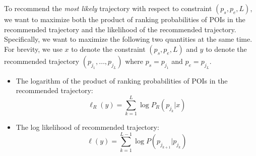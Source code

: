 To recommend the \textit{most likely} trajectory with respect to constraint $(p_s, p_e, L)$,
we want to maximize both the product of ranking probabilities of POIs in the recommended trajectory and
the likelihood of the recommended trajectory.
Specifically, we want to maximize the following two quantities at the same time.
For brevity, we use $x$ to denote the constraint $(p_s, p_e, L)$ and $y$ to denote the
recommended trajectory $(p_{j_1}, \dots, p_{j_L})$ where $p_s = p_{j_1}$ and $p_e = p_{j_L}$.

\begin{itemize}
\item The logarithm of the product of ranking probabilities of POIs in the recommended trajectory:
      \begin{displaymath}
          \ell_R(y) = \sum_{k=1}^L \log P_R(p_{j_k} | x)
      \end{displaymath}
\item The log likelihood of recommended trajectory:
      \begin{displaymath}
          \ell(y) = \sum_{k=1}^{L-1} \log P(p_{j_{k+1}} | p_{j_k})
      \end{displaymath}
\end{itemize}

